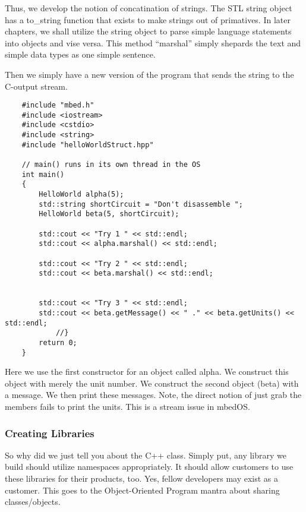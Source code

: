 \documentclass{article}
\begin{document}
Thus, we develop the notion of concatination of strings.  The STL string object has a to\_string function that exists to make strings out of primatives.   In later chapters, we shall utilize the string object to parse simple language statements into objects and vise versa.  This method ``marshal'' simply shepards the text and simple data types as one simple sentence.  

Then we simply have a new version of the program that sends the string to the C-output stream.  
\begin{lstlisting}
	#include "mbed.h"
	#include <iostream>
	#include <cstdio>
	#include <string>
	#include "helloWorldStruct.hpp"

	// main() runs in its own thread in the OS
	int main()
	{
	    HelloWorld alpha(5);
	    std::string shortCircuit = "Don't disassemble ";
	    HelloWorld beta(5, shortCircuit);

	    std::cout << "Try 1 " << std::endl;
	    std::cout << alpha.marshal() << std::endl;

	    std::cout << "Try 2 " << std::endl;
	    std::cout << beta.marshal() << std::endl; 
		

	    std::cout << "Try 3 " << std::endl;
	    std::cout << beta.getMessage() << " ." << beta.getUnits() << std::endl;
			//}
		return 0;
	}
\end{lstlisting}
Here we use the first constructor for an object called alpha.  We construct this object with merely the unit number.  We construct the second object (beta) with a message.   We then print these messages.  Note, the direct notion of just grab the members fails to print the units.  This is a stream issue in mbedOS.  





\subsubsection{Creating Libraries} %
\label{ssub:creating_libraries}


So why did we just tell you about the C++ class.  Simply put, any library we build should utilize namespaces appropriately.  It should allow customers to use these libraries for their products, too.  Yes, fellow developers may exist as a customer.  This goes to the Object-Oriented Program mantra about sharing classes/objects.  
\end{document}
